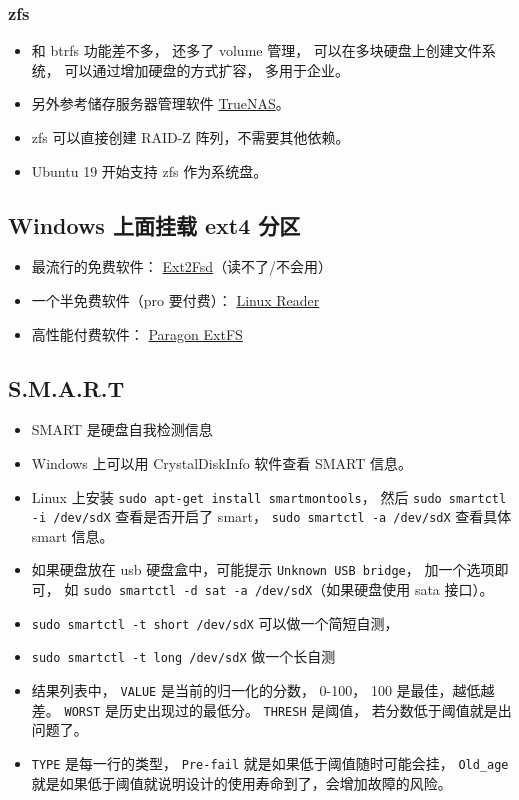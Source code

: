 \subsubsection{zfs}
\begin{itemize}
\item 和 btrfs 功能差不多， 还多了 volume 管理， 可以在多块硬盘上创建文件系统， 可以通过增加硬盘的方式扩容， 多用于企业。
\item 另外参考储存服务器管理软件 \href{https://www.truenas.com/truenas-core/}{TrueNAS}。
\item zfs 可以直接创建 RAID-Z 阵列，不需要其他依赖。
\item Ubuntu 19 开始支持 zfs 作为系统盘。
\end{itemize}


\subsection{Windows 上面挂载 ext4 分区}
\begin{itemize}
\item 最流行的免费软件： \href{https://sourceforge.net/projects/ext2fsd/}{Ext2Fsd}（读不了/不会用）
\item 一个半免费软件（pro 要付费）： \href{https://www.diskinternals.com/linux-reader/}{Linux Reader}
\item 高性能付费软件： \href{https://www.paragon-software.com/business/extfs-for-windows/}{Paragon ExtFS}
\end{itemize}

\subsection{S.M.A.R.T}
\begin{itemize}
\item SMART 是硬盘自我检测信息
\item Windows 上可以用 CrystalDiskInfo 软件查看 SMART 信息。
\item Linux 上安装 \verb`sudo apt-get install smartmontools`， 然后 \verb`sudo smartctl -i /dev/sdX` 查看是否开启了 smart， \verb`sudo smartctl -a /dev/sdX` 查看具体 smart 信息。
\item 如果硬盘放在 usb 硬盘盒中，可能提示 \verb`Unknown USB bridge`， 加一个选项即可， 如 \verb`sudo smartctl -d sat -a /dev/sdX`（如果硬盘使用 sata 接口）。
\item \verb`sudo smartctl -t short /dev/sdX` 可以做一个简短自测，
\item \verb`sudo smartctl -t long /dev/sdX` 做一个长自测
\item 结果列表中， \verb`VALUE` 是当前的归一化的分数， 0-100， 100 是最佳，越低越差。 \verb`WORST` 是历史出现过的最低分。 \verb`THRESH` 是阈值， 若分数低于阈值就是出问题了。
\item \verb`TYPE` 是每一行的类型， \verb`Pre-fail` 就是如果低于阈值随时可能会挂， \verb`Old_age` 就是如果低于阈值就说明设计的使用寿命到了，会增加故障的风险。
\end{itemize}


